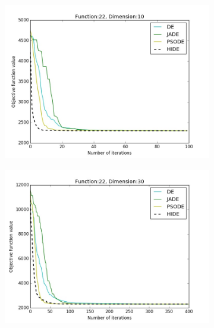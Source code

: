 \documentclass[a4paper,twoside]{article}
\begin{document}
\begin{figure}[h!]
    \begin{subfigure}[b]{0.24\textwidth}
        \includegraphics[width=\textwidth,natwidth=800,natheight=600]{plot_10D_F22_save}
        \caption{}
    \end{subfigure}
    \begin{subfigure}[b]{0.24\textwidth}
        \includegraphics[width=\textwidth,natwidth=800,natheight=600]{plot_30D_F22_save}
        \caption{}
    \end{subfigure}    
    \begin{subfigure}[b]{0.24\textwidth}

\end{subfigure}
\end{figure}
\end{document}
